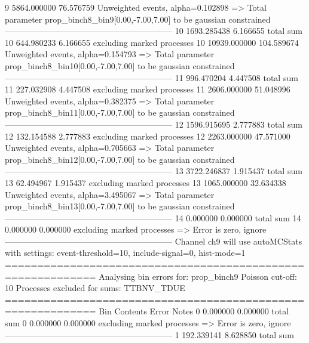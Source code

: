 9          5864.000000     76.576759       Unweighted events, alpha=0.102898
  => Total parameter prop_binch8_bin9[0.00,-7.00,7.00] to be gaussian constrained
------------------------------------------------------------
10         1693.285438     6.166655        total sum                     
10         644.980233      6.166655        excluding marked processes    
10         10939.000000    104.589674      Unweighted events, alpha=0.154793
  => Total parameter prop_binch8_bin10[0.00,-7.00,7.00] to be gaussian constrained
------------------------------------------------------------
11         996.470204      4.447508        total sum                     
11         227.032908      4.447508        excluding marked processes    
11         2606.000000     51.048996       Unweighted events, alpha=0.382375
  => Total parameter prop_binch8_bin11[0.00,-7.00,7.00] to be gaussian constrained
------------------------------------------------------------
12         1596.915695     2.777883        total sum                     
12         132.154588      2.777883        excluding marked processes    
12         2263.000000     47.571000       Unweighted events, alpha=0.705663
  => Total parameter prop_binch8_bin12[0.00,-7.00,7.00] to be gaussian constrained
------------------------------------------------------------
13         3722.246837     1.915437        total sum                     
13         62.494967       1.915437        excluding marked processes    
13         1065.000000     32.634338       Unweighted events, alpha=3.495067
  => Total parameter prop_binch8_bin13[0.00,-7.00,7.00] to be gaussian constrained
------------------------------------------------------------
14         0.000000        0.000000        total sum                     
14         0.000000        0.000000        excluding marked processes    
  => Error is zero, ignore      
------------------------------------------------------------
Channel ch9 will use autoMCStats with settings: event-threshold=10, include-signal=0, hist-mode=1
============================================================
Analysing bin errors for: prop_binch9
Poisson cut-off: 10
Processes excluded for sums: TTBNV_TDUE
============================================================
Bin        Contents        Error           Notes                         
0          0.000000        0.000000        total sum                     
0          0.000000        0.000000        excluding marked processes    
  => Error is zero, ignore      
------------------------------------------------------------
1          192.339141      8.628850        total sum                     
